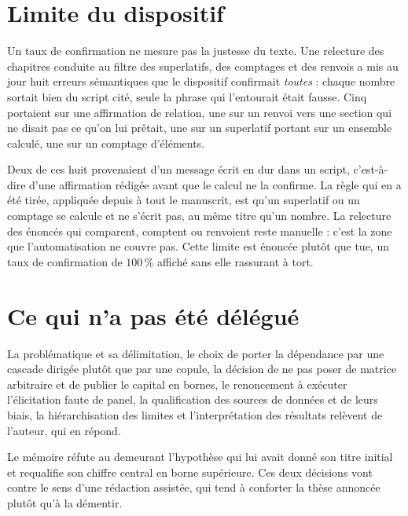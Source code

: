 \section{Limite du dispositif}

Un taux de confirmation ne mesure pas la justesse du texte. Une relecture des chapitres conduite au
filtre des superlatifs, des comptages et des renvois a mis au jour huit erreurs sémantiques que le
dispositif confirmait \emph{toutes} : chaque nombre sortait bien du script cité, seule la phrase qui
l'entourait était fausse. Cinq portaient sur une affirmation de relation, une sur un renvoi vers une
section qui ne disait pas ce qu'on lui prêtait, une sur un superlatif portant sur un ensemble
calculé, une sur un comptage d'éléments.

Deux de ces huit provenaient d'un message écrit en dur dans un script, c'est-à-dire d'une
affirmation rédigée avant que le calcul ne la confirme. La règle qui en a été tirée, appliquée
depuis à tout le manuscrit, est qu'un superlatif ou un comptage se calcule et ne s'écrit pas, au
même titre qu'un nombre. La relecture des énoncés qui comparent, comptent ou renvoient reste
manuelle : c'est la zone que l'automatisation ne couvre pas. Cette limite est énoncée plutôt que
tue, un taux de confirmation de $100\,\%$ affiché sans elle rassurant à tort.

\section{Ce qui n'a pas été délégué}

La problématique et sa délimitation, le choix de porter la dépendance par une cascade dirigée
plutôt que par une copule, la décision de ne pas poser de matrice arbitraire et de publier le
capital en bornes, le renoncement à exécuter l'élicitation faute de panel, la qualification des
sources de données et de leurs biais, la hiérarchisation des limites et l'interprétation des
résultats relèvent de l'auteur, qui en répond.

Le mémoire réfute au demeurant l'hypothèse qui lui avait donné son titre initial et requalifie son
chiffre central en borne supérieure. Ces deux décisions vont contre le sens d'une rédaction
assistée, qui tend à conforter la thèse annoncée plutôt qu'à la démentir.

